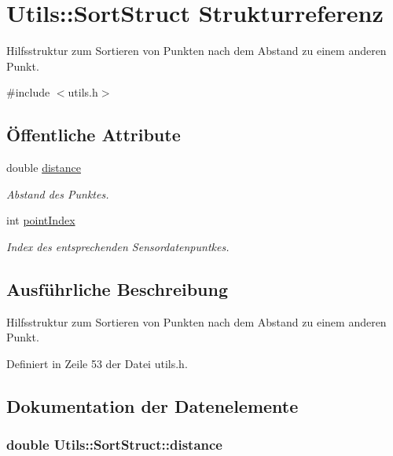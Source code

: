 \hypertarget{structUtils_1_1SortStruct}{\section{Utils\-:\-:Sort\-Struct Strukturreferenz}
\label{structUtils_1_1SortStruct}
}


Hilfsstruktur zum Sortieren von Punkten nach dem Abstand zu einem anderen Punkt.  




{\ttfamily \#include $<$utils.\-h$>$}

\subsection*{Öffentliche Attribute}
\begin{DoxyCompactItemize}
\item 
double \hyperlink{structUtils_1_1SortStruct_aca911abd52b034a588bab7b414cf93cb}{distance}
\begin{DoxyCompactList}\small\item\em Abstand des Punktes. \end{DoxyCompactList}\item 
int \hyperlink{structUtils_1_1SortStruct_ad470a3f9a230e66a47fd022bf7a4a70e}{point\-Index}
\begin{DoxyCompactList}\small\item\em Index des entsprechenden Sensordatenpuntkes. \end{DoxyCompactList}\end{DoxyCompactItemize}


\subsection{Ausführliche Beschreibung}
Hilfsstruktur zum Sortieren von Punkten nach dem Abstand zu einem anderen Punkt. 

Definiert in Zeile 53 der Datei utils.\-h.



\subsection{Dokumentation der Datenelemente}
\hypertarget{structUtils_1_1SortStruct_aca911abd52b034a588bab7b414cf93cb}{
\subsubsection[{distance}]{\setlength{\rightskip}{0pt plus 5cm}double Utils\-::\-Sort\-Struct\-::distance}}\label{structUtils_1_1SortStruct_aca911abd52b034a588bab7b414cf93cb}


